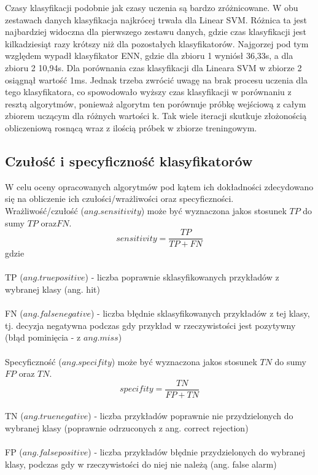 \documentclass[[10pt,a4paper]{article}
\begin{document}
Czasy klasyfikacji podobnie jak czasy uczenia są bardzo zróżnicowane. W obu zestawach danych klasyfikacja najkrócej trwała dla Linear SVM. Różnica ta jest najbardziej widoczna dla pierwszego zestawu danych, gdzie czas klasyfikacji jest kilkadziesiąt razy krótszy niż dla pozostałych klasyfikatorów. Najgorzej pod tym względem wypadł klasyfikator ENN, gdzie dla zbioru 1 wyniósł 36,33s, a dla zbioru 2 10,94s. Dla porównania czas klasyfikacji dla Lineara SVM w zbiorze 2 osiągnął wartość 1ms. Jednak trzeba zwrócić uwagę na brak procesu uczenia dla tego klasyfikatora, co spowodowało wyższy czas klasyfikacji w porównaniu z resztą algorytmów, ponieważ algorytm ten porównuje próbkę wejściową z całym zbiorem uczącym dla różnych wartości k. Tak wiele iteracji skutkuje złożonością obliczeniową rosnącą wraz z ilością próbek w zbiorze treningowym. 

\subsection{Czułość i specyficzność klasyfikatorów}

W celu oceny opracowanych algorytmów pod kątem ich dokładności zdecydowano się na obliczenie ich czułości/wrażliwości oraz specyficzności.\\

Wrażliwość/czułość ($ang. sensitivity$) może być wyznaczona jakos stosunek $TP$ do sumy $TP$ oraz$ FN$.
 $$
sensitivity = \frac{TP}{TP + FN}
$$
gdzie\\
\\
TP ($ang. true positive$) - liczba poprawnie sklasyfikowanych przykładów z wybranej klasy (ang. hit)\\
\\
FN ($ang. false negative$) - liczba błędnie sklasyfikowanych przykładów z tej klasy, tj. decyzja negatywna podczas gdy przykład w rzeczywistości jest pozytywny (błąd pominięcia - z $ang. miss$)\\
\\
Specyficzność ($ang. specifity$) może być wyznaczona jakos stosunek $TN$ do sumy $FP$ oraz $TN$.\\
 $$
specifity = \frac{TN}{FP + TN}
$$
\\
TN ($ang. true negative$) - liczba przykładów poprawnie nie przydzielonych do wybranej klasy (poprawnie odrzuconych z ang. correct rejection)\\
\\
FP ($ang. false positive$) - liczba przykładów błędnie przydzielonych do wybranej klasy, podczas gdy w rzeczywistości do niej nie należą (ang. false alarm)\\
\end{document}
